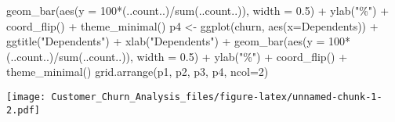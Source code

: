 \documentclass[
]{article}
\newenvironment{Shaded}{\begin{snugshade}}{\end{snugshade}}
\newcommand{\AttributeTok}[1]{\textcolor[rgb]{0.77,0.63,0.00}{#1}}
\newcommand{\DecValTok}[1]{\textcolor[rgb]{0.00,0.00,0.81}{#1}}
\newcommand{\FloatTok}[1]{\textcolor[rgb]{0.00,0.00,0.81}{#1}}
\newcommand{\FunctionTok}[1]{\textcolor[rgb]{0.00,0.00,0.00}{#1}}
\newcommand{\NormalTok}[1]{#1}
\newcommand{\OtherTok}[1]{\textcolor[rgb]{0.56,0.35,0.01}{#1}}
\newcommand{\SpecialCharTok}[1]{\textcolor[rgb]{0.00,0.00,0.00}{#1}}
\newcommand{\StringTok}[1]{\textcolor[rgb]{0.31,0.60,0.02}{#1}}
\begin{document}
\begin{Shaded}
\begin{Highlighting}[]
  \FunctionTok{geom\_bar}\NormalTok{(}\FunctionTok{aes}\NormalTok{(}\AttributeTok{y =} \DecValTok{100}\SpecialCharTok{*}\NormalTok{(..count..)}\SpecialCharTok{/}\FunctionTok{sum}\NormalTok{(..count..)), }\AttributeTok{width =} \FloatTok{0.5}\NormalTok{) }\SpecialCharTok{+} \FunctionTok{ylab}\NormalTok{(}\StringTok{"\%"}\NormalTok{) }\SpecialCharTok{+} \FunctionTok{coord\_flip}\NormalTok{() }\SpecialCharTok{+} \FunctionTok{theme\_minimal}\NormalTok{()}
\NormalTok{p4 }\OtherTok{\textless{}{-}} \FunctionTok{ggplot}\NormalTok{(churn, }\FunctionTok{aes}\NormalTok{(}\AttributeTok{x=}\NormalTok{Dependents)) }\SpecialCharTok{+} \FunctionTok{ggtitle}\NormalTok{(}\StringTok{"Dependents"}\NormalTok{) }\SpecialCharTok{+} \FunctionTok{xlab}\NormalTok{(}\StringTok{"Dependents"}\NormalTok{) }\SpecialCharTok{+}
  \FunctionTok{geom\_bar}\NormalTok{(}\FunctionTok{aes}\NormalTok{(}\AttributeTok{y =} \DecValTok{100}\SpecialCharTok{*}\NormalTok{(..count..)}\SpecialCharTok{/}\FunctionTok{sum}\NormalTok{(..count..)), }\AttributeTok{width =} \FloatTok{0.5}\NormalTok{) }\SpecialCharTok{+} \FunctionTok{ylab}\NormalTok{(}\StringTok{"\%"}\NormalTok{) }\SpecialCharTok{+} \FunctionTok{coord\_flip}\NormalTok{() }\SpecialCharTok{+} \FunctionTok{theme\_minimal}\NormalTok{()}
\FunctionTok{grid.arrange}\NormalTok{(p1, p2, p3, p4, }\AttributeTok{ncol=}\DecValTok{2}\NormalTok{)}
\end{Highlighting}
\end{Shaded}

\texttt{[image: Customer\_Churn\_Analysis\_files/figure-latex/unnamed-chunk-1-2.pdf]}
\end{document}
